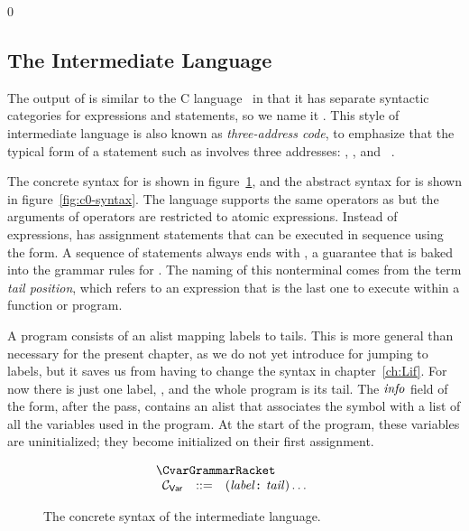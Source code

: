 \documentclass[7x10]{TimesAPriori_MIT}%
\def\racketEd{0}
\def\edition{1}
\numberwithin{theorem}{chapter}
\numberwithin{definition}{chapter}
\numberwithin{equation}{chapter}
\begin{document}
{\if\edition\racketEd  
\subsection{The \LangCVar{} Intermediate Language}

The output of  is similar to the C
language~\citep{Kernighan:1988nx} in that it has separate syntactic
categories for expressions and statements, so we name it \LangCVar{}.
This style of intermediate language is also known as
\emph{three-address code}, to emphasize that the typical form of a
statement such as  involves three
addresses: , , and ~\citep{Aho:2006wb}.

The concrete syntax for \LangCVar{} is shown in
figure~\ref{fig:c0-concrete-syntax}, and the abstract syntax for
\LangCVar{} is shown in figure~\ref{fig:c0-syntax}.
%
The \LangCVar{} language supports the same operators as \LangVar{} but
the arguments of operators are restricted to atomic
expressions. Instead of  expressions, \LangCVar{} has
assignment statements that can be executed in sequence using the
 form. A sequence of statements always ends with
, a guarantee that is baked into the grammar rules for
. The naming of this nonterminal comes from the term
\emph{tail position}, which refers to an
expression that is the last one to execute within a function or
program.

A \LangCVar{} program consists of an alist mapping labels to
tails. This is more general than necessary for the present chapter, as
we do not yet introduce  for jumping to labels, but it saves
us from having to change the syntax in chapter~\ref{ch:Lif}.  For now
there is just one label, , and the whole program is
its tail.
%
The $\mathit{info}$ field of the  form, after the
 pass, contains an alist that associates the
symbol  with a list of all the variables used in the
program. At the start of the program, these variables are
uninitialized; they become initialized on their first assignment.

\begin{figure}[tbp]
\begin{tcolorbox}[colback=white]
\[
\begin{array}{l}
  \CvarGrammarRacket \\
\begin{array}{lcl}
\LangCVarM{} & ::= & (\itm{label}\key{:}~ \Tail)\ldots
\end{array}
\end{array}
\]
\end{tcolorbox}
\caption{The concrete syntax of the \LangCVar{} intermediate language.}
\label{fig:c0-concrete-syntax}
\end{figure}


}
\end{document}
